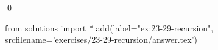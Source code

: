 
\begin{ex}
  \label{ex:23-29-recursion}
  
  \qed
\end{ex}
\begin{python0}
from solutions import *
add(label="ex:23-29-recursion",
    srcfilename='exercises/23-29-recursion/answer.tex')
\end{python0}
